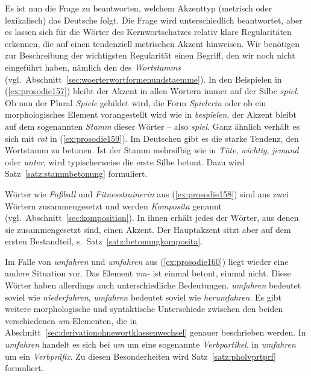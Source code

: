 Es ist nun die Frage zu beantworten, welchem Akzenttyp (metrisch oder lexikalisch) das Deutsche folgt.
Die Frage wird unterschiedlich beantwortet, aber es lassen sich für die Wörter des Kernwortschatzes relativ klare Regularitäten erkennen, die auf einen tendenziell metrischen Akzent hinweisen.
Wir benötigen zur Beschreibung der wichtigsten Regularität einen Begriff, den wir noch nicht eingeführt haben, nämlich den des \label{abs:wortakzentimdeutschen170}\textit{Wortstamms} (vgl.\ Abschnitt~\ref{sec:woerterwortformenundstaemme}).
In den Beispielen in (\ref{ex:prosodie157}) bleibt der Akzent in allen Wörtern immer auf der Silbe \textit{spiel}.
Ob nun der Plural \textit{Spiele} gebildet wird, die Form \textit{Spielerin} oder ob ein morphologisches Element vorangestellt wird wie in \textit{bespielen}, der Akzent bleibt auf dem sogenannten \textit{Stamm} dieser Wörter -- also \textit{spiel}.
Ganz ähnlich verhält es sich mit \textit{rot} in (\ref{ex:prosodie159}).
Im Deutschen gibt es die starke Tendenz, den Wortstamm zu betonen.
Ist der Stamm mehrsilbig wie in \textit{Tüte}, \textit{wichtig}, \textit{jemand} oder \textit{unter}, wird typischerweise die erste Silbe betont.
Dazu wird Satz~\ref{satz:stammbetonung} formuliert.

\Stretch[0.5]


Wörter wie \textit{Fußball} und \textit{Fitnesstrainerin} aus (\ref{ex:prosodie158}) sind aus zwei Wörtern zusammengesetzt und werden \textit{Komposita} genannt (vgl.\ Abschnitt~\ref{sec:komposition}).
In ihnen erhält jedes der Wörter, aus denen sie zusammengesetzt sind, einen Akzent.
Der Hauptakzent sitzt aber auf dem ersten Bestandteil, s.\ Satz~\ref{satz:betonungkomposita}.

\Stretch[0.5]


Im Falle von \textit{\Akz umfahren} und \textit{um\Akz fahren} aus (\ref{ex:prosodie160}) liegt wieder eine andere Situation vor.
Das Element \textit{um-} ist einmal betont, einmal nicht.
Diese Wörter haben allerdings auch unterschiedliche Bedeutungen.
\textit{\Akz umfahren} bedeutet soviel wie \textit{niederfahren}, \textit{um\Akz fahren} bedeutet soviel wie \textit{herumfahren}.
Es gibt weitere morphologische und syntaktische Unterschiede zwischen den beiden verschiedenen \textit{um}-Elementen, die in Abschnitt~\ref{sec:derivationohnewortklassenwechsel} genauer beschrieben werden.
In \textit{\Akz umfahren} handelt es sich bei \textit{um} um eine sogenannte \textit{Verbpartikel}, in \textit{um\Akz fahren} um ein \textit{Verbpräfix}.
Zu diesen Besonderheiten wird Satz~\ref{satz:pholvprtprf} formuliert.

